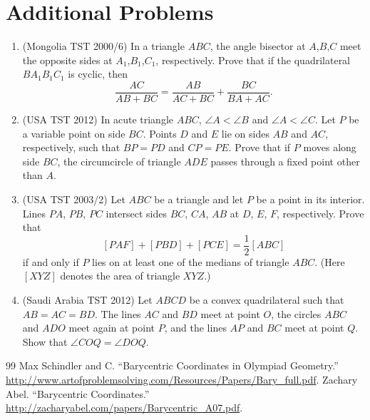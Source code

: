 \documentclass{scrartcl}
\begin{document}
\section{Additional Problems}
\begin{enumerate}
  \item (Mongolia TST 2000/6) In a triangle $ABC$, the angle bisector at $A$,$B$,$C$ meet the opposite sides at $A_1$,$B_1$,$C_1$, respectively. Prove that if the quadrilateral $BA_1B_1C_1$ is cyclic, then \[ \frac{AC}{AB+BC} = \frac{AB}{AC+BC} + \frac{BC}{BA+AC}. \]
  \item (USA TST 2012) In acute triangle $ABC$, $\angle A < \angle B$ and $\angle A < \angle C$.  Let $P$ be a variable point on side $BC$.  Points $D$ and $E$ lie on sides $AB$ and $AC$, respectively, such that $BP = PD$ and $CP = PE$.  Prove that if $P$ moves along side $BC$, the circumcircle of triangle $ADE$ passes through a fixed point other than $A$.
   \item (USA TST 2003/2) Let $ABC$ be a triangle and let $P$ be a point in its interior. Lines $PA$, $PB$, $PC$ intersect sides $BC$, $CA$, $AB$ at $D$, $E$, $F$, respectively. Prove that \[ [PAF]+[PBD]+[PCE]=\frac{1}{2}[ABC]  \] if and only if $P$ lies on at least one of the medians of triangle $ABC$. (Here $[XYZ]$ denotes the area of triangle $XYZ$.)
  \item (Saudi Arabia TST 2012) Let $ABCD$ be a convex quadrilateral such that $AB = AC = BD$.  The lines $AC$ and $BD$ meet at point $O$, the circles $ABC$ and $ADO$ meet again at point $P$, and the lines $AP$ and $BC$ meet at point $Q$.  Show that $\angle COQ = \angle DOQ$.
\end{enumerate}

\begin{thebibliography}{99}
   Max Schindler and C.  ``Barycentric Coordinates in Olympiad Geometry.'' \\ \url{http://www.artofproblemsolving.com/Resources/Papers/Bary_full.pdf}.
   Zachary Abel.  ``Barycentric Coordinates.'' \\ \url{http://zacharyabel.com/papers/Barycentric\_A07.pdf}.
\end{thebibliography}
\end{document}
